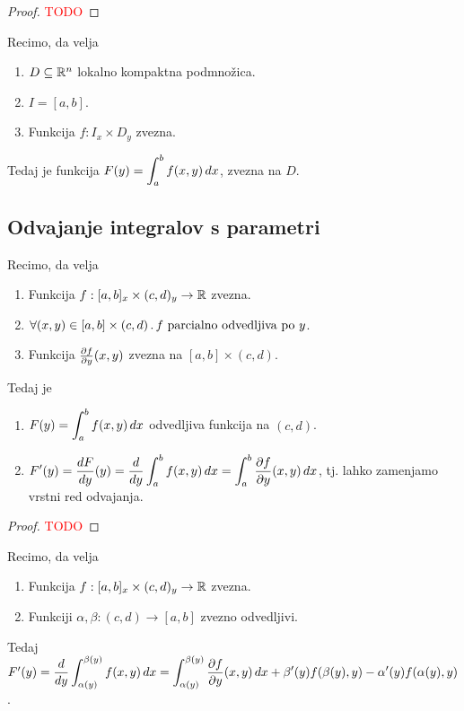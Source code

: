 \begin{proof}
    \textcolor{red}{TODO}
\end{proof}

\begin{posledica}
    Recimo, da velja
    \begin{enumerate}
        \item $D \subseteq \mathbb{R}^n$ lokalno kompaktna podmnožica.
        \item $I = [a,b]$.
        \item Funkcija $f: I_x \times D_y$ zvezna.
    \end{enumerate}
    Tedaj je funkcija $\displaystyle F(y) = \int_{a}^{b}f(x,y) \, dx$, zvezna na $D$.
\end{posledica}

\subsection{Odvajanje integralov s parametri}
\begin{trditev}
    Recimo, da velja
    \begin{enumerate}
        \item Funkcija $f:[a,b]_x \times (c,d)_y \to \mathbb{R}$ zvezna.
        \item $\forall (x,y) \in [a,b] \times (c,d) \,.\, f \text{ parcialno odvedljiva po } y$.
        \item Funkcija $\frac{\partial f}{\partial y}(x,y)$ zvezna na $[a,b] \times (c,d)$.
    \end{enumerate}
    Tedaj je 
    \begin{enumerate}
        \item $\displaystyle F(y) = \int_{a}^{b}f(x,y) \, dx$ odvedljiva funkcija na $(c,d)$.
        \item $\displaystyle F'(y) = \frac{dF}{dy}(y) = \frac{d}{dy} \int_{a}^{b}f(x,y) \, dx = \int_{a}^{b} \frac{\partial f}{\partial y}(x,y) \, dx$, tj. lahko zamenjamo vrstni red odvajanja.
    \end{enumerate}    
\end{trditev}

\begin{proof}
    \textcolor{red}{TODO}
\end{proof}

\begin{posledica}
    Recimo, da velja
    \begin{enumerate}
        \item Funkcija $f:[a,b]_x \times (c,d)_y \to \mathbb{R}$ zvezna.
        \item Funkciji $\alpha, \beta: (c,d) \to [a,b]$ zvezno odvedljivi.
    \end{enumerate}
    Tedaj $F'(y) = \displaystyle \frac{d}{dy} \int_{\alpha(y)}^{\beta(y)}f(x,y) \, dx = \int_{\alpha(y)}^{\beta(y)} \frac{\partial f}{\partial y}(x,y) \, dx + \beta'(y)f(\beta(y), y) - \alpha'(y)f(\alpha(y), y)$.
\end{posledica}

